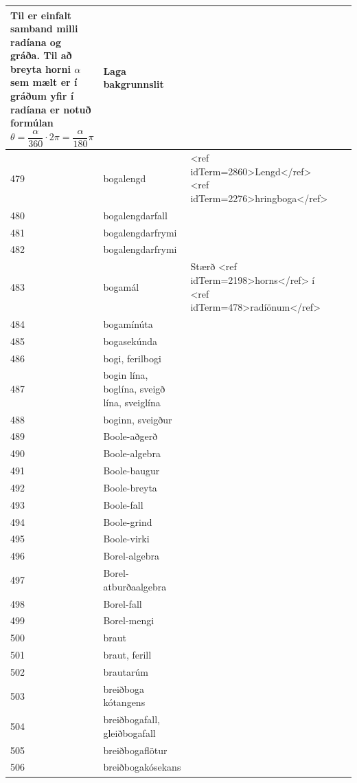 \begin{longtable}{p{}|p{}|p{}|p{}|p{}}
Til er einfalt samband milli radíana og gráða. Til að breyta horni $\alpha$ sem mælt er í gráðum yfir í radíana er notuð formúlan \[ \theta = \frac{\alpha}{360}\cdot 2\pi = \frac{\alpha}{180} \pi \] & Laga bakgrunnslit \\
\hline
479 & bogalengd & <ref idTerm=2860>Lengd</ref> <ref idTerm=2276>hringboga</ref> &  &  \\
\hline
480 & bogalengdarfall &  &  &  \\
\hline
481 & bogalengdarfrymi &  &  &  \\
\hline
482 & bogalengdarfrymi &  &  &  \\
\hline
483 & bogamál & Stærð <ref idTerm=2198>horns</ref> í <ref idTerm=478>radíönum</ref> &  & \\
\hline
484 & bogamínúta &  &  &  \\
\hline
485 & bogasekúnda &  &  &  \\
\hline
486 & bogi, ferilbogi &  &  &  \\
\hline
487 & bogin lína, boglína, sveigð lína, sveiglína &  &  &  \\
\hline
488 & boginn, sveigður &  &  & \\
\hline
489 & Boole-aðgerð &  &  &  \\
\hline
490 & Boole-algebra &  &  &  \\
\hline
491 & Boole-baugur &  &  &  \\
\hline
492 & Boole-breyta &  &  &  \\
\hline
493 & Boole-fall &  &  &  \\
\hline
494 & Boole-grind &  &  &  \\
\hline
495 & Boole-virki &  &  &  \\
\hline
496 & Borel-algebra &  &  &  \\
\hline
497 & Borel-atburðaalgebra &  &  &  \\
\hline
498 & Borel-fall &  &  &  \\
\hline
499 & Borel-mengi &  &  &  \\
\hline
500 & braut &  &  &  \\
\hline
501 & braut, ferill &  &  &  \\
\hline
502 & brautarúm &  &  &  \\
\hline
503 & breiðboga kótangens &  &  &  \\
\hline
504 & breiðbogafall, gleiðbogafall &  &  &  \\
\hline
505 & breiðbogaflötur &  &  &  \\
\hline
506 & breiðbogakósekans &  &  &  \\

\end{longtable}
